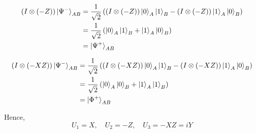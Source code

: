 \documentclass[a4paper,11pt]{article}
\begin{document}
\begin{align}
    (I\otimes (-Z))\ket{\Psi^-}_{AB}
    &=\frac{1}{\sqrt 2}\left((I\otimes (-Z))\ket{0}_A\ket{1}_B-(I\otimes (-Z))\ket{1}_A\ket{0}_B\right) \\
    &=\frac{1}{\sqrt 2}\left(\ket{0}_A\ket{1}_B+\ket{1}_A\ket{0}_B\right)\\
    &=\ket{\Psi^+}_{AB}
\end{align}

\begin{align}
    (I\otimes (-XZ))\ket{\Psi^-}_{AB}
    &=\frac{1}{\sqrt 2}\left((I\otimes (-XZ))\ket{0}_A\ket{1}_B-(I\otimes (-XZ))\ket{1}_A\ket{0}_B\right) \\
    &=\frac{1}{\sqrt 2}\left(\ket{0}_A\ket{0}_B+\ket{1}_A\ket{1}_B\right)\\
    &=\ket{\Phi^+}_{AB}
\end{align}

Hence,
\begin{equation}
    U_1=X,\quad U_2=-Z,\quad U_3=-XZ=iY
\end{equation}
\end{document}
